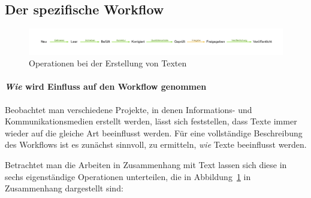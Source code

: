 \subsection{Der spezifische Workflow}\label{l:workflow}

\begin{figure}[htb]
\begin{center}
\includegraphics[width=\textwidth]{media/chart-3.pdf}
\end{center}
\caption{Operationen bei der Erstellung von Texten}
\label{chart:3}
\end{figure}

\paragraph{\emph{Wie} wird Einfluss auf den Workflow genommen} Beobachtet man verschiedene Projekte, in denen Informations- und Kommunikationsmedien erstellt werden, lässt sich feststellen, dass Texte immer wieder auf die gleiche Art beeinflusst werden. Für eine vollständige Beschreibung des Workflows ist es zunächst sinnvoll, zu ermitteln, \emph{wie} Texte beeinflusst werden. 

Betrachtet man die Arbeiten in Zusammenhang mit Text lassen sich diese in sechs eigenständige Operationen unterteilen, die in Abbildung~\ref{chart:3} in Zusammenhang dargestellt sind:

